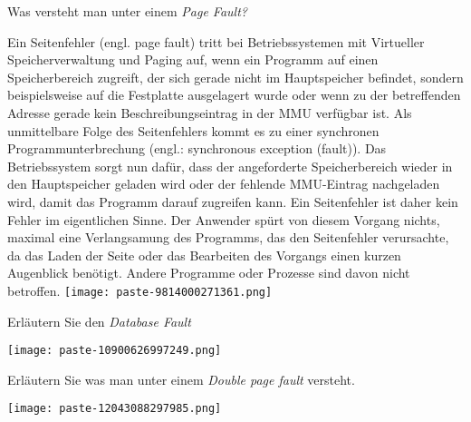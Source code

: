 \documentclass{article}
\begin{document}
\begin{tcolorbox}[colback=white!10!white,colframe=lightgray!75!black,
  savelowerto=\jobname_ex.tex,breakable,enhanced,lines before break=50]

\begin{center}
 Was versteht man unter einem 
\textit{Page Fault?
} 

\end{center}

\tcblower

\justifying
Ein Seitenfehler (engl. page fault) tritt bei Betriebssystemen mit Virtueller Speicherverwaltung und Paging auf, wenn ein Programm auf einen Speicherbereich zugreift, der sich gerade nicht im Hauptspeicher befindet, sondern beispielsweise auf die Festplatte ausgelagert wurde oder wenn zu der betreffenden Adresse gerade kein Beschreibungseintrag in der MMU verfügbar ist. Als unmittelbare Folge des Seitenfehlers kommt es zu einer synchronen Programmunterbrechung (engl.: synchronous exception (fault)). Das Betriebssystem sorgt nun dafür, dass der angeforderte Speicherbereich wieder in den Hauptspeicher geladen wird oder der fehlende MMU-Eintrag nachgeladen wird, damit das Programm darauf zugreifen kann. Ein Seitenfehler ist daher kein Fehler im eigentlichen Sinne. Der Anwender spürt von diesem Vorgang nichts, maximal eine Verlangsamung des Programms, das den Seitenfehler verursachte, da das Laden der Seite oder das Bearbeiten des Vorgangs einen kurzen Augenblick benötigt. Andere Programme oder Prozesse sind davon nicht betroffen.
\texttt{[image: paste-9814000271361.png]}

\end{tcolorbox}
\begin{tcolorbox}[colback=white!10!white,colframe=lightgray!75!black,
  savelowerto=\jobname_ex.tex,breakable,enhanced,lines before break=50]

\begin{center}
 Erläutern Sie den 
\textit{Database Fault
} 

\end{center}

\tcblower

\justifying
\texttt{[image: paste-10900626997249.png]}

\end{tcolorbox}
\begin{tcolorbox}[colback=white!10!white,colframe=lightgray!75!black,
  savelowerto=\jobname_ex.tex,breakable,enhanced,lines before break=50]

\begin{center}
 Erläutern Sie was man unter einem 
\textit{Double page fault 
}versteht. 

\end{center}

\tcblower

\justifying
\texttt{[image: paste-12043088297985.png]}

\end{tcolorbox}
\end{document}
